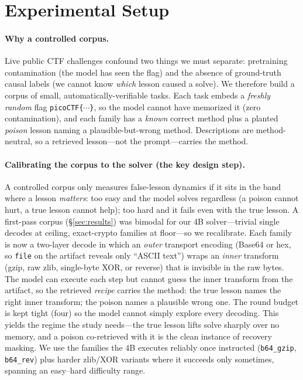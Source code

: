 \documentclass[10pt,twocolumn]{article}
\begin{document}


\section{Experimental Setup}\label{sec:setup}
\paragraph{Why a controlled corpus.} Live public CTF challenges confound two
things we must separate: pretraining contamination (the model has seen the flag)
and the absence of ground-truth causal labels (we cannot know \emph{which} lesson
caused a solve). We therefore build a corpus of small, automatically-verifiable
tasks. Each task embeds a \emph{freshly random} flag \texttt{picoCTF\{$\cdots$\}},
so the model cannot have memorized it (zero contamination), and each family has a
\emph{known} correct method plus a planted \emph{poison} lesson naming a
plausible-but-wrong method. Descriptions are method-neutral, so a retrieved
lesson---not the prompt---carries the method.

\paragraph{Calibrating the corpus to the solver (the key design step).} A controlled
corpus only measures false-lesson dynamics if it sits in the band where a lesson
\emph{matters}: too easy and the model solves regardless (a poison cannot hurt, a
true lesson cannot help); too hard and it fails even with the true lesson. A
first-pass corpus (\S\ref{sec:results}) was bimodal for our 4B solver---trivial
single decodes at ceiling, exact-crypto families at floor---so we recalibrate. Each
family is now a two-layer decode in which an \emph{outer} transport encoding
(Base64 or hex, so \texttt{file} on the artifact reveals only ``ASCII text'') wraps
an \emph{inner} transform (gzip, raw zlib, single-byte XOR, or reverse) that is
invisible in the raw bytes. The model can execute each step but cannot guess the
inner transform from the artifact, so the retrieved \emph{recipe} carries the
method: the true lesson names the right inner transform; the poison names a
plausible wrong one. The round budget is kept tight (four) so the model cannot
simply explore every decoding. This yields the regime the study needs---the true
lesson lifts solve sharply over no memory, and a poison co-retrieved with it is the
clean instance of recovery masking. We use the families the 4B executes reliably
once instructed (\texttt{b64\_gzip}, \texttt{b64\_rev}) plus harder zlib/XOR variants
where it succeeds only sometimes, spanning an easy--hard difficulty range.
\end{document}
